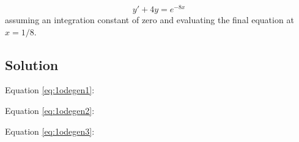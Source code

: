 \begin{equation}
    \label{eq:1odegen3}
    y' + 4y = e^{-8x}
\end{equation}
assuming an integration constant of zero and evaluating the final equation at $x=1/8$.

\subsection*{Solution}
Equation \ref{eq:1odegen1}: 

Equation \ref{eq:1odegen2}: 

Equation \ref{eq:1odegen3}: 

\timebox





